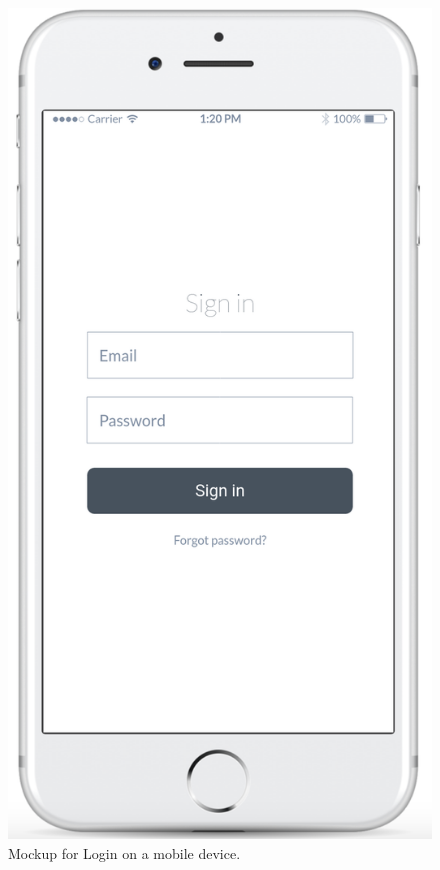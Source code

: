 \documentclass{article}
\begin{document}
	\begin{figure}[h!]
		\bigskip
		\centering
		\includegraphics[scale=0.25]{img/mockups/mobile/login.png}
		\caption{Mockup for Login on a mobile device.}
	\end{figure}
	
	\newpage
\end{document}
